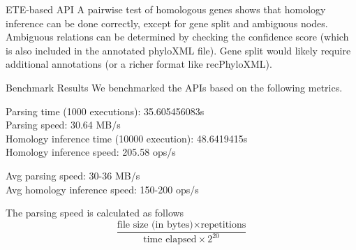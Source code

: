 \documentclass{beamer}
\begin{document}
\begin{frame}{ETE-based API}
    A pairwise test of homologous genes shows that homology inference can be done correctly, except for gene split and ambiguous nodes. Ambiguous relations can be determined by checking the confidence score (which is also included in the annotated phyloXML file). Gene split would likely require additional annotations (or a richer format like recPhyloXML).
\end{frame}

\begin{frame}{Benchmark Results}
    We benchmarked the APIs based on the following metrics.

    Parsing time (1000 executions): 35.605456083s \\
    Parsing speed: 30.64 MB/s \\
    Homology inference time (10000 execution): 48.6419415s \\
    Homology inference speed: 205.58 ops/s

    Avg parsing speed: 30-36 MB/s \\
    Avg homology inference speed: 150-200 ops/s

    The parsing speed is calculated as follows
    $$
    \frac{\text{file size (in bytes)} \times \text{repetitions}}{\text{time elapsed} \times 2^{20}}
    $$
\end{frame}
\end{document}
